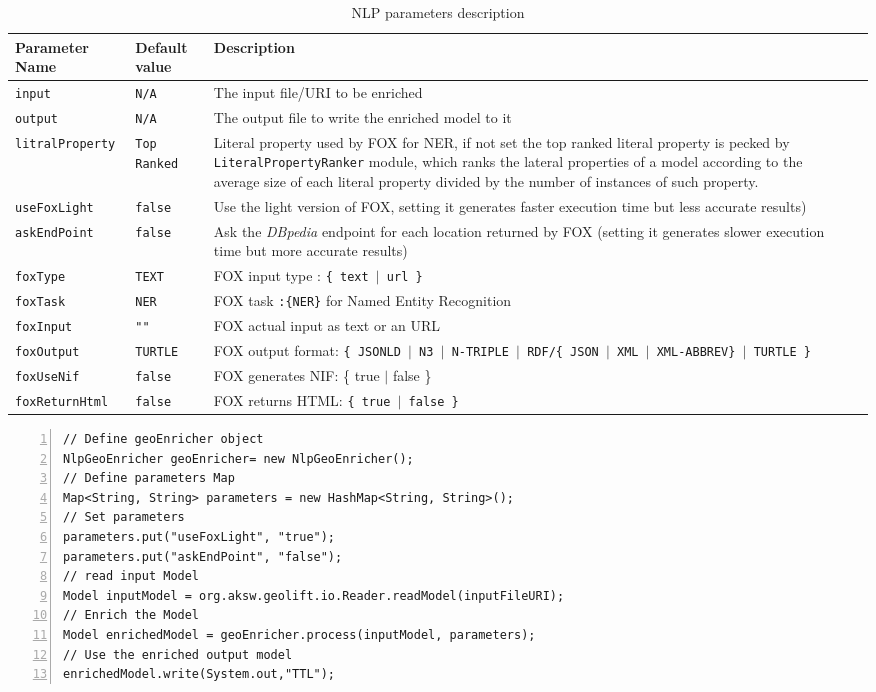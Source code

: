 \documentclass[a4paper,twoside,bibtotoc,abstracton,12pt,BCOR=15mm]{article}
\begin{document}
\begin{table}[ht]
\caption{NLP parameters description} \label{tbl:nlpPram}
\begin{tabular}{@{}  l  l p{7cm} l p{6cm}@{}}
\toprule
\textbf{Parameter Name} & \textbf{Default value} & \textbf{Description}\\
\midrule
\texttt{input} 		& \texttt{N/A} 		& The input file/URI to be enriched\\
\texttt{output} 	& \texttt{N/A} 		& The output file to write the enriched model to it\\
\texttt{litralProperty}	& \texttt{Top Ranked} 	& Literal property used by FOX for NER, if not set the top ranked literal property is pecked by \texttt{LiteralPropertyRanker} module, which ranks the  lateral properties of a model according to the average size of each literal property divided by the number of instances of such property.\\
\texttt{useFoxLight} 	& \texttt{false} 	& Use the light version of FOX, setting it generates faster execution time but less accurate results) \\
\texttt{askEndPoint} 	& \texttt{false} 	& Ask the \emph{DBpedia} endpoint for each location returned by FOX (setting it generates slower execution time but more accurate results)\\
\texttt{foxType} 	& \texttt{TEXT} 	& FOX input type : \texttt{\{ text $\rvert$ url \}}\\
\texttt{foxTask} 	& \texttt{NER} 		& FOX task \texttt{:\{NER\}} for Named Entity Recognition\\
\texttt{foxInput} 	& \texttt{""} 		& FOX actual input as text or an URL\\
\texttt{foxOutput} 	& \texttt{TURTLE} 	& FOX output format: \texttt{\{ JSONLD $\rvert$ N3 $\rvert$ N-TRIPLE $\rvert$ RDF/\{ JSON $\rvert$ XML $\rvert$ XML-ABBREV\} $\rvert$ TURTLE \}}\\
\texttt{foxUseNif} 	& \texttt{false} 	& FOX generates NIF: \{ true $\rvert$ false \}\\
\texttt{foxReturnHtml} & \texttt{false} 	& FOX returns HTML: \texttt{\{ true $\rvert$ false \}}\\ 
\bottomrule
\end{tabular}
\end{table}

\newpage

\begin{lstlisting}[label=lst:NlpGeoEnricher, numbers=left, numberstyle=\tiny, caption = Code fragment to call the \texttt{NlpGeoEnricher} class.]
// Define geoEnricher object
NlpGeoEnricher geoEnricher= new NlpGeoEnricher();
// Define parameters Map
Map<String, String> parameters = new HashMap<String, String>();
// Set parameters
parameters.put("useFoxLight", "true");
parameters.put("askEndPoint", "false");
// read input Model
Model inputModel = org.aksw.geolift.io.Reader.readModel(inputFileURI);
// Enrich the Model
Model enrichedModel = geoEnricher.process(inputModel, parameters);
// Use the enriched output model
enrichedModel.write(System.out,"TTL");

\end{lstlisting}
 
\end{document}
